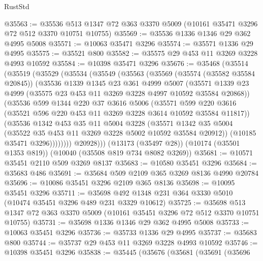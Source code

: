 \begin{lexlean}{RustStd}
\begin{coremodule}
@35563 := @35536 @513 @1347 @72 @363 @3370 @5009 (@10161 @35471 @3296 @72 @512 @3370 @10751 @10755)
@35569 := @35536 @1336 @1346 @29 @362 @4995 @5008
@35571 := @10063 @35471 @3296
@35574 := @35571 @1336 @29 @4995
@35575 := @35521 @800
@35582 := @35575 @29 @453 @11 @3269 @3228 @4993 @10592
@35584 := @10398 @35471 @3296
@35676 := @35468
    (@35514
      (@35519
        (@35529
          (@35534
            (@35549
              (@35563
                (@35569
                  (@35574 (@35582 @35584 @20845))
                  (@35536
                    @1339
                    @1345
                    @23
                    @361
                    @4999
                    @5007
                    (@35571
                      @1339
                      @23
                      @4999
                      (@35575 @23 @453 @11 @3269 @3228 @4997 @10592 @35584 @20868))
                    (@35536
                      @599
                      @1344
                      @220
                      @37
                      @3616
                      @5006
                      (@35571
                        @599
                        @220
                        @3616
                        (@35521 @596 @220 @453 @11 @3269 @3228 @3614 @10592 @35584 @11817))
                      (@35536
                        @1342
                        @453
                        @35
                        @11
                        @5004
                        @3228
                        (@35571
                          @1342
                          @35
                          @5004
                          (@35522 @35 @453 @11 @3269 @3228 @5002 @10592 @35584 @20912))
                        (@10185 @35471 @3296))))))))
          @20928)))
    (@13173 (@35497 @28))
    (@10174 (@35501 @1353 @819))
    (@10040 (@35508 @819 @734 @8082 @3269))
@35681 := @10571 @35451 @2110 @509 @3269 @8137
@35683 := @10580 @35451 @3296
@35684 := @35683 @486
@35691 := @35684 @509 @2109 @365 @3269 @8136 @4990 @20784
@35696 := @10086 @35451 @3296 @2109 @365 @8136
@35698 := @10095 @35451 @3296
@35711 := @35698 @492 @1348 @231 @364 @3330 @5010 (@10474 @35451 @3296 @489 @231 @3329 @10612)
@35725 := @35698 @513 @1347 @72 @363 @3370 @5009 (@10161 @35451 @3296 @72 @512 @3370 @10751 @10755)
@35731 := @35698 @1336 @1346 @29 @362 @4995 @5008
@35733 := @10063 @35451 @3296
@35736 := @35733 @1336 @29 @4995
@35737 := @35683 @800
@35744 := @35737 @29 @453 @11 @3269 @3228 @4993 @10592
@35746 := @10398 @35451 @3296
@35838 := @35445
    (@35676
      (@35681
        (@35691
          (@35696

\end{coremodule}
\end{lexlean}
